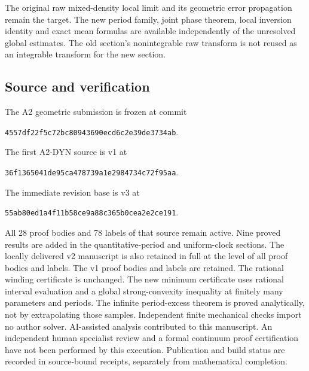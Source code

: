 The original raw mixed-density local limit and its geometric error
propagation remain the target. The new period family, joint phase theorem,
local inversion identity and exact mean formulas are available independently
of the unresolved global estimates. The old section's nonintegrable raw
transform is not reused as an integrable transform for the new section.

\subsection*{Source and verification}
The A2 geometric submission is frozen at commit
\begin{center}\small\texttt{4557df22f5c72bc80943690ecd6c2e39de3734ab}.\end{center} The first A2-DYN
source is v1 at
\begin{center}\small\texttt{36f1365041de95ca478739a1e2984734c72f95aa}.\end{center}
The immediate revision base is v3 at
\begin{center}\small\texttt{55ab80ed1a4f11b58ce9a88c365b0cea2e2ce191}.\end{center}
All 28 proof bodies and 78 labels of that source remain active. Nine
proved results are added in the quantitative-period and uniform-clock
sections. The locally delivered v2 manuscript is also retained in full at the level
of all proof bodies and labels. The v1 proof bodies and labels are retained. The rational winding certificate is unchanged.
The new minimum certificate uses rational interval evaluation and a global
strong-convexity inequality at finitely many parameters and periods. The
infinite period-excess theorem is proved analytically, not by extrapolating
those samples. Independent finite mechanical checks import no author solver.
AI-assisted analysis contributed to this manuscript. An independent human
specialist review and a formal continuum proof certification have not been
performed by this execution. Publication and build status are recorded in
source-bound receipts, separately from mathematical completion.
